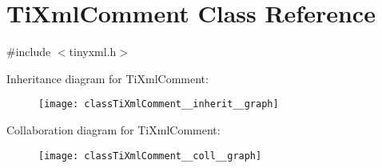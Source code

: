 \hypertarget{classTiXmlComment}{}\section{Ti\+Xml\+Comment Class Reference}
\label{classTiXmlComment}


{\ttfamily \#include $<$tinyxml.\+h$>$}



Inheritance diagram for Ti\+Xml\+Comment\+:\nopagebreak
\begin{figure}[H]
\begin{center}
\leavevmode
\texttt{[image: classTiXmlComment\_\_inherit\_\_graph]}
\end{center}
\end{figure}


Collaboration diagram for Ti\+Xml\+Comment\+:\nopagebreak
\begin{figure}[H]
\begin{center}
\leavevmode
\texttt{[image: classTiXmlComment\_\_coll\_\_graph]}
\end{center}
\end{figure}
